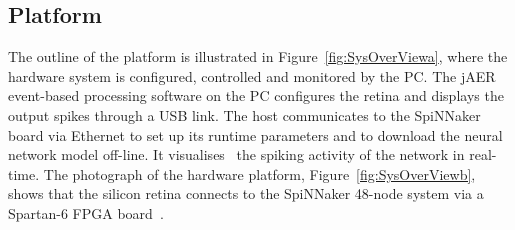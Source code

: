 \documentclass[journal]{journal}
\begin{document}
\subsection{Platform}
The outline of the platform is illustrated in Figure~\ref{fig:SysOverViewa}, where the hardware system is configured, controlled and monitored by the PC.
The jAER~\cite{delbruck2008frame} event-based processing software on the PC configures the retina and displays the output spikes through a USB link.
The host communicates to the SpiNNaker board via Ethernet to set up its runtime parameters and to download the neural network model off-line.
It visualises~\cite{6252490} the spiking activity of the network in real-time.
The photograph of the hardware platform, Figure~\ref{fig:SysOverViewb}, shows that the silicon retina connects to the SpiNNaker 48-node system via a Spartan-6 FPGA board~\cite{galluppi2012real}.
\end{document}
